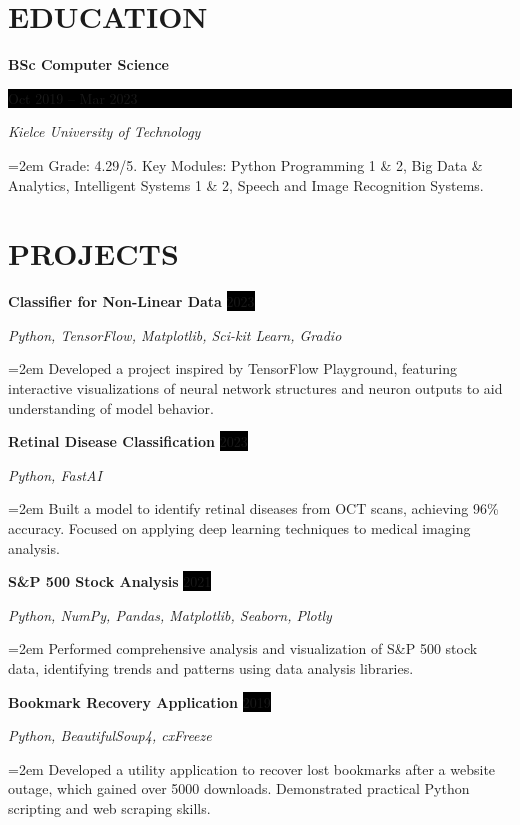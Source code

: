 \documentclass[paper=a4,fontsize=11pt]{scrartcl} %
\newcommand{\sepspace}{\vspace*{1em}} %
\newcommand{\NewPart}[1]{\section*{\uppercase{#1}}} %
\newcommand{\EducationEntry}[4]{
\noindent \textbf{#1} \hfill      %
\colorbox{Black}{%
\parbox{6em}{%
\centering\color{White}#2}} \par  %
\noindent \textit{#3} \par        %
\noindent\hangindent=2em\hangafter=0 \small #4 %
\normalsize \par} %
\newcommand{\WorkEntry}[4]{
\noindent \textbf{#1} \hfill      %
\colorbox{Black}{\color{White}#2} \par %
\noindent \textit{#3} \par              %
\noindent\hangindent=2em\hangafter=0 \small #4 %
\normalsize \par} %
\begin{document}
\NewPart{Education}{}

\EducationEntry{BSc Computer Science}{Oct 2019 -- Mar 2023}{Kielce University of Technology}{
Grade: 4.29/5.
Key Modules: Python Programming 1 \& 2, Big Data \& Analytics, Intelligent Systems 1 \& 2, Speech and Image Recognition Systems.
}
\sepspace

\NewPart{Projects}{}

\WorkEntry{Classifier for Non-Linear Data}{2023}{Python, TensorFlow, Matplotlib, Sci-kit Learn, Gradio}{
Developed a project inspired by TensorFlow Playground, featuring interactive visualizations of neural network structures and neuron outputs to aid understanding of model behavior.
}
\sepspace

\WorkEntry{Retinal Disease Classification}{2023}{Python, FastAI}{
Built a model to identify retinal diseases from OCT scans, achieving 96\% accuracy. Focused on applying deep learning techniques to medical imaging analysis.
}
\sepspace

\WorkEntry{S\&P 500 Stock Analysis}{2021}{Python, NumPy, Pandas, Matplotlib, Seaborn, Plotly}{
Performed comprehensive analysis and visualization of S\&P 500 stock data, identifying trends and patterns using data analysis libraries.
}
\sepspace

\WorkEntry{Bookmark Recovery Application}{2019}{Python, BeautifulSoup4, cxFreeze}{
Developed a utility application to recover lost bookmarks after a website outage, which gained over 5000 downloads. Demonstrated practical Python scripting and web scraping skills.
}
\end{document}
